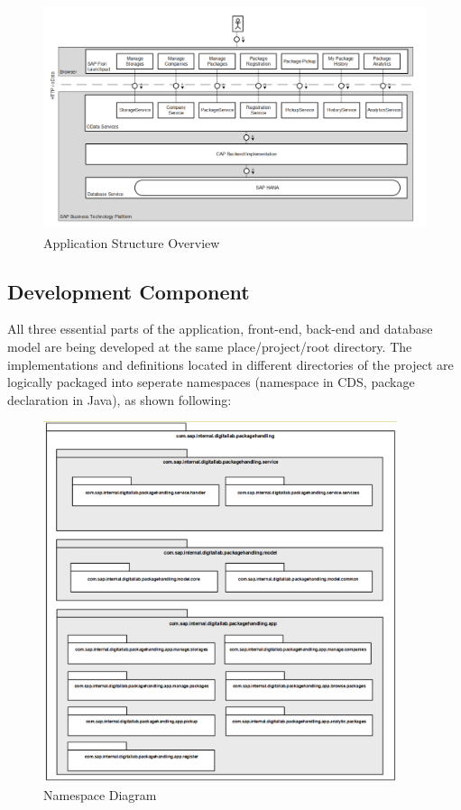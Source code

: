 \begin{figure}[H]
	\centering
	\includegraphics[height=250px]{images/Application_Structure.png}
	\caption{Application Structure Overview}
	\label{fig:appStruct}
\end{figure}

\subsection{Development Component}

All three essential parts of the application, front-end, back-end and database model are being developed at the same place/project/root directory. The implementations and definitions located in different directories of the project are logically packaged into seperate namespaces (namespace in CDS, package declaration in Java), as shown following:

\begin{figure}[H]
	\centering
	\includegraphics[height=400px]{images/Package_Diagram.png}
	\caption{Namespace Diagram}
	\label{fig:packStruc}
\end{figure}


